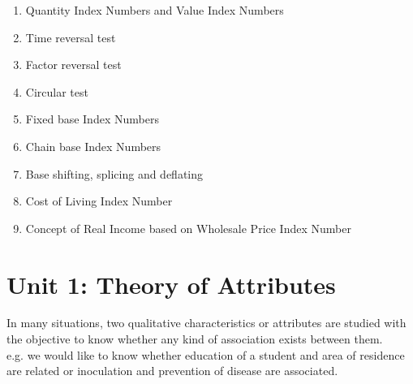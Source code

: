 \documentclass[
10pt, %
a4paper, %
]{report}
\begin{document}
\begin{itemize}
\begin{enumerate}
\begin{itemize}
\end{itemize} 
\item Quantity Index Numbers and Value Index Numbers
\item Time reversal test
\item Factor reversal test
\item Circular test
\item Fixed base Index Numbers
\item Chain base Index Numbers
\item Base shifting, splicing and deflating
\item Cost of Living Index Number
\item Concept of Real Income based on Wholesale Price Index Number
\end{enumerate}
\end{itemize}

\chapter*{Unit 1: Theory of Attributes}

In many situations, two qualitative characteristics or attributes are studied with the objective to know whether any kind of association exists between them. \\
e.g. we would like to know whether education of a student and area of residence are related or inoculation and prevention of disease are associated.
\end{document}
